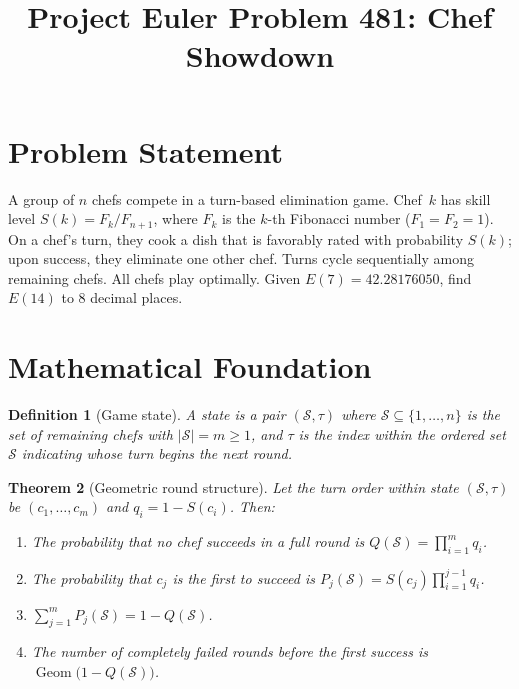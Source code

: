 \documentclass[12pt]{article}
\title{Project Euler Problem 481: Chef Showdown}
\author{}
\date{}
\newtheorem{theorem}{Theorem}
\newtheorem{definition}[theorem]{Definition}
\begin{document}
\maketitle

\section{Problem Statement}
A group of $n$ chefs compete in a turn-based elimination game. Chef~$k$ has skill level $S(k) = F_k/F_{n+1}$, where $F_k$ is the $k$-th Fibonacci number ($F_1 = F_2 = 1$). On a chef's turn, they cook a dish that is favorably rated with probability $S(k)$; upon success, they eliminate one other chef. Turns cycle sequentially among remaining chefs. All chefs play optimally. Given $E(7) = 42.28176050$, find $E(14)$ to 8 decimal places.

\section{Mathematical Foundation}

\begin{definition}[Game state]
A \emph{state} is a pair $(\mathcal{S},\tau)$ where $\mathcal{S}\subseteq\{1,\ldots,n\}$ is the set of remaining chefs with $|\mathcal{S}|=m\ge 1$, and $\tau$ is the index within the ordered set $\mathcal{S}$ indicating whose turn begins the next round.
\end{definition}

\begin{theorem}[Geometric round structure]\label{thm:round}
Let the turn order within state $(\mathcal{S},\tau)$ be $(c_1,\ldots,c_m)$ and $q_i = 1 - S(c_i)$. Then:
\begin{enumerate}
\item[(i)] The probability that no chef succeeds in a full round is $Q(\mathcal{S}) = \prod_{i=1}^m q_i$.
\item[(ii)] The probability that $c_j$ is the first to succeed is $P_j(\mathcal{S}) = S(c_j)\prod_{i=1}^{j-1}q_i$.
\item[(iii)] $\sum_{j=1}^m P_j(\mathcal{S}) = 1 - Q(\mathcal{S})$.
\item[(iv)] The number of completely failed rounds before the first success is $\operatorname{Geom}\bigl(1-Q(\mathcal{S})\bigr)$.
\end{enumerate}
\end{theorem}
\end{document}
